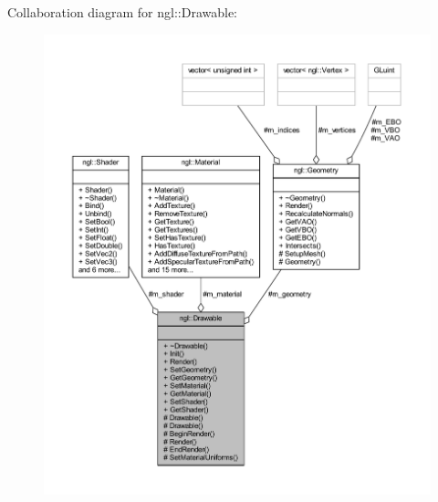 Collaboration diagram for ngl\+:\+:Drawable\+:
\nopagebreak
\begin{figure}[H]
\begin{center}
\leavevmode
\includegraphics[width=350pt]{classngl_1_1_drawable__coll__graph}
\end{center}
\end{figure}
